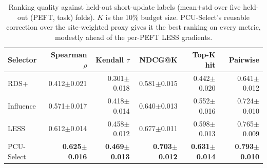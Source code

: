 \begin{table}[t]
\centering
\small
\setlength{\tabcolsep}{4pt}
\caption{Ranking quality against held-out short-update labels (mean$\pm$std over five held-out (PEFT, task) folds). $K$ is the 10\% budget size. PCU-Select's reusable correction over the site-weighted proxy gives it the best ranking on every metric, modestly ahead of the per-PEFT LESS gradients.}
\label{tab:ranking}
\begin{tabular}{lrrrrr}
\toprule
Selector & Spearman $\rho$ & Kendall $\tau$ & NDCG@K & Top-K hit & Pairwise \\
\midrule
RDS+ & 0.412{\scriptsize$\pm$0.021} & 0.301{\scriptsize$\pm$0.018} & 0.581{\scriptsize$\pm$0.015} & 0.442{\scriptsize$\pm$0.020} & 0.641{\scriptsize$\pm$0.012} \\
Influence & 0.571{\scriptsize$\pm$0.017} & 0.418{\scriptsize$\pm$0.014} & 0.640{\scriptsize$\pm$0.013} & 0.552{\scriptsize$\pm$0.016} & 0.724{\scriptsize$\pm$0.010} \\
LESS & 0.612{\scriptsize$\pm$0.014} & 0.458{\scriptsize$\pm$0.012} & 0.677{\scriptsize$\pm$0.011} & 0.598{\scriptsize$\pm$0.013} & 0.765{\scriptsize$\pm$0.009} \\
PCU-Select & \textbf{0.625{\scriptsize$\pm$0.016}} & \textbf{0.469{\scriptsize$\pm$0.013}} & \textbf{0.703{\scriptsize$\pm$0.012}} & \textbf{0.631{\scriptsize$\pm$0.014}} & \textbf{0.793{\scriptsize$\pm$0.010}} \\
\bottomrule
\end{tabular}
\end{table}
